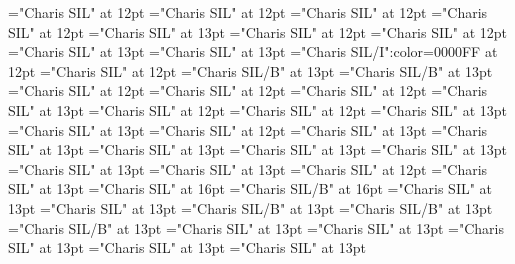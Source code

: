 \documentclass[a4paper]{article}
\begin{document}
\pagestyle{plain}
\sloppy
\setlength{\parfillskip}{0pt plus 1fil}
\font\xitemhi="Charis SIL" at 12pt
\font\xitemte="Charis SIL" at 12pt
\font\xitemxitemCmPossibilitypublishStemTransTypeAbbreviationPubbefore="Charis SIL" at 12pt
\font\xitemxitemcomplexformrefsbefore="Charis SIL" at 12pt
\font\xitemxitemdefinitionbefore="Charis SIL" at 13pt
\font\xitemxitemdefinitionLcbefore="Charis SIL" at 12pt
\font\xitemxitemdefinitionLdbefore="Charis SIL" at 12pt
\font\xitemxitementryrefcomponentbefore="Charis SIL" at 13pt
\font\xitemxitementryreftypebefore="Charis SIL" at 13pt
\font\xitemxitemexamplebefore="Charis SIL/I":color=0000FF at 12pt
\font\xitemxitemexamplesbefore="Charis SIL" at 12pt
\font\xitemxitemheadwordbefore="Charis SIL/B" at 13pt
\font\xitemxitemLexEntrypublishStemComponentTargetHeadWordRefbefore="Charis SIL/B" at 13pt
\font\xitemxitemLexSensepublishStemDefinitionPubbefore="Charis SIL" at 12pt
\font\xitemxitemLexSensepublishStemDefinitionPubLdbefore="Charis SIL" at 12pt
\font\xitemxitemprimaryrefsbefore="Charis SIL" at 12pt
\font\xitemxitempronunciationbefore="Charis SIL" at 13pt
\font\xitemxitempronunciationsbefore="Charis SIL" at 12pt
\font\xitemxitemsemanticdomainsbefore="Charis SIL" at 12pt
\font\sensesensesensesbefore="Charis SIL" at 13pt
\font\xitemxitemtranslationbefore="Charis SIL" at 13pt
\font\xitemxitemtranslationLdbefore="Charis SIL" at 12pt
\font\xitemxitemcrossrefbefore="Charis SIL" at 13pt
\font\xitemxitemcrossreftargetsbefore="Charis SIL" at 13pt
\font\xitemxitemcrossreftypebefore="Charis SIL" at 13pt
\font\xitemxitemheadwordminorbefore="Charis SIL" at 13pt
\font\xitemxitemmainentryrefbefore="Charis SIL" at 13pt
\font\xitemxitemmainentryrefminorbefore="Charis SIL" at 13pt
\font\xitemxitempronunciationminorbefore="Charis SIL" at 13pt
\font\xitemxitemsensecrossrefbefore="Charis SIL" at 12pt
\font\xitemxitemsensemainentryrefbefore="Charis SIL" at 13pt
\font{}="Charis SIL" at 16pt
\font{}="Charis SIL/B" at 16pt
\font{}="Charis SIL" at 13pt
\font\entryletDatadicBody="Charis SIL" at 13pt
\font\headwordggoTeluINentryletDatadicBody="Charis SIL/B" at 13pt
\font\headwordafterentryletDatadicBody="Charis SIL/B" at 13pt
\font\spanenheadwordggoTeluINentryletDatadicBody="Charis SIL/B" at 13pt
\font\spanentryletDatadicBody="Charis SIL" at 13pt
\font\pronunciationggofonipaxemicspanentryletDatadicBody="Charis SIL" at 13pt
\font\spanenpronunciationggofonipaxemicspanentryletDatadicBody="Charis SIL" at 13pt
\font\spanggofonipaxemicpronunciationggofonipaxemicspanentryletDatadicBody="Charis SIL" at 13pt
\font\spanenspanentryletDatadicBody="Charis SIL" at 13pt
\end{document}

